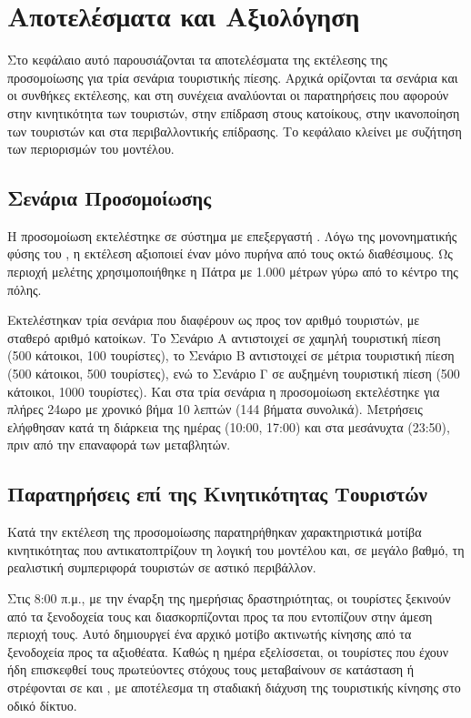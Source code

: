 \chapter{Αποτελέσματα και Αξιολόγηση}

Στο κεφάλαιο αυτό παρουσιάζονται τα αποτελέσματα της εκτέλεσης
της προσομοίωσης για τρία σενάρια τουριστικής πίεσης. Αρχικά
ορίζονται τα σενάρια και οι συνθήκες εκτέλεσης, και στη
συνέχεια αναλύονται οι παρατηρήσεις που αφορούν στην
κινητικότητα των τουριστών, στην επίδραση στους κατοίκους,
στην ικανοποίηση των τουριστών και στα 
περιβαλλοντικής επίδρασης. Το κεφάλαιο κλείνει με συζήτηση
των περιορισμών του μοντέλου.

\section{Σενάρια Προσομοίωσης}

Η προσομοίωση εκτελέστηκε σε σύστημα με επεξεργαστή
. Λόγω της μονονηματικής
φύσης του , η εκτέλεση αξιοποιεί έναν μόνο
πυρήνα από τους οκτώ διαθέσιμους. Ως περιοχή μελέτης
χρησιμοποιήθηκε η Πάτρα με  1.000 μέτρων γύρω από
το κέντρο της πόλης.

Εκτελέστηκαν τρία σενάρια που διαφέρουν ως προς τον αριθμό
τουριστών, με σταθερό αριθμό κατοίκων. Το Σενάριο Α αντιστοιχεί
σε χαμηλή τουριστική πίεση (500 κάτοικοι, 100 τουρίστες),
το Σενάριο Β αντιστοιχεί σε μέτρια τουριστική πίεση
(500 κάτοικοι, 500 τουρίστες), ενώ το Σενάριο Γ σε αυξημένη
τουριστική πίεση (500 κάτοικοι, 1000 τουρίστες). Και στα τρία
σενάρια η προσομοίωση εκτελέστηκε για πλήρες 24ωρο με χρονικό
βήμα 10 λεπτών (144 βήματα συνολικά). Μετρήσεις ελήφθησαν κατά
τη διάρκεια της ημέρας (10:00, 17:00) και στα μεσάνυχτα (23:50),
πριν από την επαναφορά των μεταβλητών.

\section{Παρατηρήσεις επί της Κινητικότητας Τουριστών}

Κατά την εκτέλεση της προσομοίωσης παρατηρήθηκαν χαρακτηριστικά
μοτίβα κινητικότητας που αντικατοπτρίζουν τη λογική του μοντέλου
και, σε μεγάλο βαθμό, τη ρεαλιστική συμπεριφορά τουριστών σε
αστικό περιβάλλον.

Στις 8:00 π.μ., με την έναρξη της ημερήσιας δραστηριότητας, οι
τουρίστες ξεκινούν από τα ξενοδοχεία τους και διασκορπίζονται προς
τα  που εντοπίζουν στην άμεση περιοχή τους. Αυτό
δημιουργεί ένα αρχικό μοτίβο ακτινωτής κίνησης από τα ξενοδοχεία
προς τα αξιοθέατα. Καθώς η ημέρα εξελίσσεται, οι τουρίστες που
έχουν ήδη επισκεφθεί τους πρωτεύοντες στόχους τους μεταβαίνουν
σε κατάσταση  ή στρέφονται σε
 και , με αποτέλεσμα τη σταδιακή διάχυση
της τουριστικής κίνησης στο οδικό δίκτυο.

